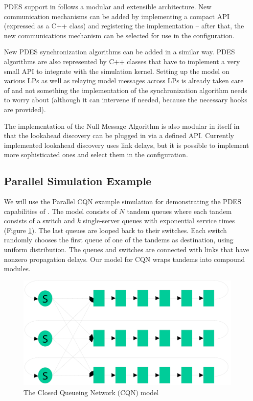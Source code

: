 PDES support in {\opp} follows a modular and extensible architecture.
New communication mechanisms can be added by implementing a compact
API (expressed as a C++ class) and registering the implementation --
after that, the new communications mechanism can be selected for use
in the configuration.

New PDES synchronization algorithms can be added in a similar way.
PDES algorithms are also represented by C++ classes that have
to implement a very small API
to integrate with the simulation kernel.
Setting up the model on various LPs as well as relaying
model messages across LPs is already taken care of and
not something the implementation of the synchronization algorithm
needs to worry about (although it can intervene if needed,
because the necessary hooks are provided).

The implementation of the Null Message Algorithm is also
modular in itself in that the lookahead discovery can be plugged
in via a defined API. Currently implemented lookahead
discovery uses link delays, but it is possible to
implement more sophisticated ones and select them in the
configuration.



\subsection{Parallel Simulation Example}

We will use the Parallel CQN example simulation for demonstrating the
PDES capabilities of {\opp}.
The model consists of $N$ tandem queues where each tandem consists
of a switch and $k$ single-server queues with exponential service times
(Figure \ref{fig:cqn-model}).
The last queues are looped back to their switches. Each switch
randomly chooses the first queue of one of the tandems as destination,
using uniform distribution. The queues and switches are connected
with links that have nonzero propagation delays.
Our {\opp} model for CQN wraps tandems into compound modules.


\begin{figure}[htbp]
  \begin{center}
    \includegraphics{figures/parsim-cqn-model}
    \caption{The Closed Queueing Network (CQN) model}
    \label{fig:cqn-model}
  \end{center}
\end{figure}


